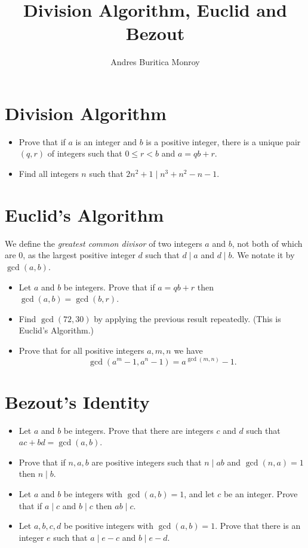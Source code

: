\documentclass{article}
\title{Division Algorithm, Euclid and Bezout}
\author{Andres Buritica Monroy}
\date{}
\begin{document}
\maketitle
\section{Division Algorithm}
  \begin{itemize}
    \item Prove that if $a$ is an integer and $b$ is a positive integer, there
      is a unique pair $(q,r)$ of integers such that $0\le r<b$ and $a=qb+r$.
    \item Find all integers $n$ such that $2n^2+1\mid n^3+n^2-n-1$.
  \end{itemize}
\section{Euclid's Algorithm}
  We define the \emph{greatest common divisor} of two integers $a$ and $b$, not
  both of which are 0, as the largest positive integer $d$ such that $d\mid a$
  and $d\mid b$. We notate it by $\gcd(a,b)$.
  \begin{itemize}
    \item Let $a$ and $b$ be integers. Prove that if $a=qb+r$ then
      $\gcd(a,b)=\gcd(b,r)$.
    \item Find $\gcd(72,30)$ by applying the previous result repeatedly. (This
      is Euclid's Algorithm.)
    \item Prove that for all positive integers $a,m,n$ we have
      \[\gcd(a^m-1,a^n-1)=a^{\gcd(m,n)}-1.\]
  \end{itemize}
\section{Bezout's Identity}
  \begin{itemize}
    \item Let $a$ and $b$ be integers. Prove that there are integers $c$ and $d$
      such that $ac+bd=\gcd(a,b)$.
    \item Prove that if $n,a,b$ are positive integers such that $n\mid ab$ and
      $\gcd(n,a)=1$ then $n\mid b$.
    \item Let $a$ and $b$ be integers with $\gcd(a,b)=1$, and let $c$ be an
      integer. Prove that if $a\mid c$ and $b\mid c$ then $ab\mid c$.
    \item Let $a,b,c,d$ be positive integers with $\gcd(a,b)=1$. Prove that there is an integer $e$
      such that $a\mid e-c$ and $b\mid e-d$.
  \end{itemize}
\newpage
\end{document}
